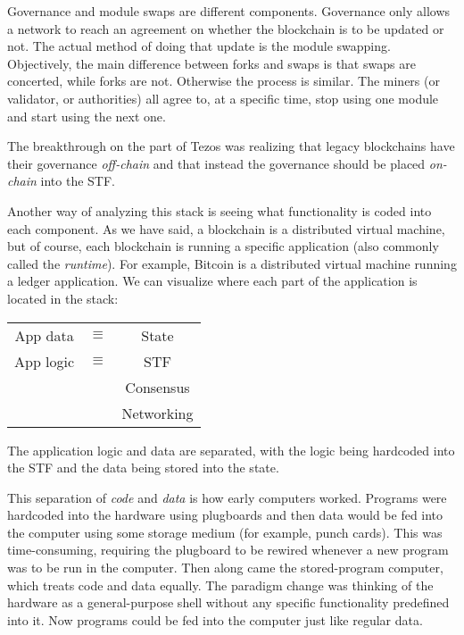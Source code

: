 \documentclass[conference]{IEEEtran}
\begin{document}
Governance and module swaps are different components. Governance only allows a network to reach an agreement on whether the blockchain is to be updated or not. The actual method of doing that update is the module swapping. Objectively, the main difference between forks and swaps is that swaps are concerted, while forks are not. Otherwise the process is similar. The miners (or validator, or authorities) all agree to, at a specific time, stop using one module and start using the next one.

The breakthrough on the part of Tezos was realizing that legacy blockchains have their governance \textit{off-chain} and that instead the governance should be placed \textit{on-chain} into the STF.

Another way of analyzing this stack is seeing what functionality is coded into each component. As we have said, a blockchain is a distributed virtual machine, but of course, each blockchain is running a specific application (also commonly called the \textit{runtime}). For example, Bitcoin is a distributed virtual machine running a ledger application. We can visualize where each part of the application is located in the stack:

\begin{center}
	\begin{tabular}{c c c}
		App data & $\equiv$ & State\\
		\cline{1-1} \cline{3-3}
		App logic & $\equiv$ & STF\\
		\cline{3-3}
		 &  & Consensus\\
		\cline{3-3}
		&  & Networking
	\end{tabular}
\end{center}

The application logic and data are separated, with the logic being hardcoded into the STF and the data being stored into the state.

This separation of \textit{code} and \textit{data} is how early computers worked. Programs were hardcoded into the hardware using plugboards and then data would be fed into the computer using some storage medium (for example, punch cards). This was time-consuming, requiring the plugboard to be rewired whenever a new program was to be run in the computer. Then along came the stored-program computer, which treats code and data equally. The paradigm change was thinking of the hardware as a general-purpose shell without any specific functionality predefined into it. Now programs could be fed into the computer just like regular data.
\end{document}
